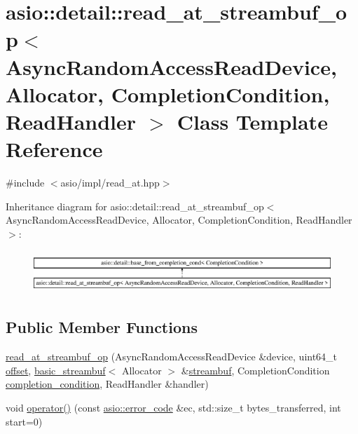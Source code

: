 \hypertarget{classasio_1_1detail_1_1read__at__streambuf__op}{}\section{asio\+:\+:detail\+:\+:read\+\_\+at\+\_\+streambuf\+\_\+op$<$ Async\+Random\+Access\+Read\+Device, Allocator, Completion\+Condition, Read\+Handler $>$ Class Template Reference}
\label{classasio_1_1detail_1_1read__at__streambuf__op}


{\ttfamily \#include $<$asio/impl/read\+\_\+at.\+hpp$>$}

Inheritance diagram for asio\+:\+:detail\+:\+:read\+\_\+at\+\_\+streambuf\+\_\+op$<$ Async\+Random\+Access\+Read\+Device, Allocator, Completion\+Condition, Read\+Handler $>$\+:\begin{figure}[H]
\begin{center}
\leavevmode
\includegraphics[height=1.613833cm]{classasio_1_1detail_1_1read__at__streambuf__op}
\end{center}
\end{figure}
\subsection*{Public Member Functions}
\begin{DoxyCompactItemize}
\item 
\hyperlink{classasio_1_1detail_1_1read__at__streambuf__op_a51fe77725685ac4b978bd80c5c6a7db8}{read\+\_\+at\+\_\+streambuf\+\_\+op} (Async\+Random\+Access\+Read\+Device \&device, uint64\+\_\+t \hyperlink{group__async__read__at_ga8dcdb41a4adfd6fe5322b5dd666d9f29}{offset}, \hyperlink{classasio_1_1basic__streambuf}{basic\+\_\+streambuf}$<$ Allocator $>$ \&\hyperlink{namespaceasio_a6a7ba348943527312eeace3492bf32ee}{streambuf}, Completion\+Condition \hyperlink{group__async__read_gae2e215d5013596cc2b385bb6c13fa518}{completion\+\_\+condition}, Read\+Handler \&handler)
\item 
void \hyperlink{classasio_1_1detail_1_1read__at__streambuf__op_a0ab130b8f14c9d8a9600881766321ef2}{operator()} (const \hyperlink{classasio_1_1error__code}{asio\+::error\+\_\+code} \&ec, std\+::size\+\_\+t bytes\+\_\+transferred, int start=0)
\end{DoxyCompactItemize}
